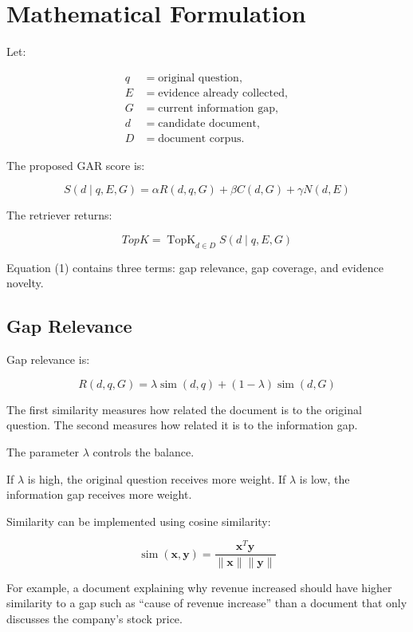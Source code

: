 \documentclass[11pt,a4paper]{article}
\begin{document}
\section{Mathematical Formulation}

Let:

\begin{align}
q &= \text{original question},\\
E &= \text{evidence already collected},\\
G &= \text{current information gap},\\
d &= \text{candidate document},\\
D &= \text{document corpus}.
\end{align}

The proposed GAR score is:

\[
\boxed{
S(d\mid q,E,G)
=
\alpha R(d,q,G)
+
\beta C(d,G)
+
\gamma N(d,E)
}
\tag{1}
\]

The retriever returns:

\[
\boxed{
TopK =
\operatorname{TopK}_{d\in D}
S(d\mid q,E,G)
}
\tag{2}
\]

Equation (1) contains three terms: gap relevance, gap coverage, and evidence novelty.

\subsection{Gap Relevance}

Gap relevance is:

\[
\boxed{
R(d,q,G)
=
\lambda\operatorname{sim}(d,q)
+
(1-\lambda)\operatorname{sim}(d,G)
}
\tag{3}
\]

The first similarity measures how related the document is to the original question. The second measures how related it is to the information gap.

The parameter $\lambda$ controls the balance.

If $\lambda$ is high, the original question receives more weight. If $\lambda$ is low, the information gap receives more weight.

Similarity can be implemented using cosine similarity:

\[
\boxed{
\operatorname{sim}(\mathbf{x},\mathbf{y})
=
\frac{\mathbf{x}^{T}\mathbf{y}}
{\|\mathbf{x}\|\|\mathbf{y}\|}
}
\tag{4}
\]

For example, a document explaining why revenue increased should have higher similarity to a gap such as ``cause of revenue increase'' than a document that only discusses the company's stock price.
\end{document}
